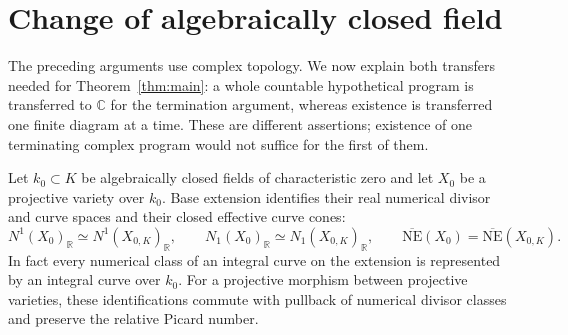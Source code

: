 \section{Change of algebraically closed field}\label{sec:field}

The preceding arguments use complex topology.  We now explain
both transfers needed for Theorem~\ref{thm:main}: a whole
countable hypothetical program is transferred to $\mathbb C$
for the termination argument, whereas existence is transferred
one finite diagram at a time.  These are different assertions;
existence of one terminating complex program would not suffice
for the first of them.

\begin{lemma}\label{lem:numerical-extension}
Let $k_0\subset K$ be algebraically closed fields of
characteristic zero and let $X_0$ be a projective variety over
$k_0$.  Base extension identifies their real numerical divisor
and curve spaces and their closed effective curve cones:
\[
 N^1(X_0)_{\mathbb R}\simeq N^1(X_{0,K})_{\mathbb R},
 \qquad
 N_1(X_0)_{\mathbb R}\simeq N_1(X_{0,K})_{\mathbb R},
 \qquad
 \overline{\mathrm{NE}}(X_0)
    =\overline{\mathrm{NE}}(X_{0,K}).
\]
In fact every numerical class of an integral curve on the
extension is represented by an integral curve over $k_0$.
For a projective morphism between projective varieties, these
identifications commute with pullback of numerical divisor
classes and preserve the relative Picard number.
\end{lemma}

